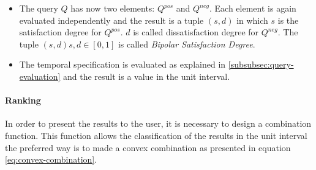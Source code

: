 \begin{itemize}
\item
The query $Q$ has now two elements: $Q^{pos}$ and $Q^{neg}$. Each element is again evaluated independently and the result is a tuple $\left(s,d \right)$ in which $s$ is the satisfaction degree for $Q^{pos}$. $d$ is called dissatisfaction degree for $Q^{neg}$. The tuple $\left(s,d \right) s,d \in \left[0,1 \right]$ is called \emph{Bipolar Satisfaction Degree}.
\item
The temporal specification is evaluated as explained in \ref{subsubsec:query-evaluation} and the result is a value in the unit interval.
\end{itemize}

\paragraph{Ranking}
In order to present the results to the user, it is necessary to design a combination function. This function allows the classification of the results in the unit interval the preferred way is to made a convex combination as  presented in equation \eqref{eq:convex-combination}.


